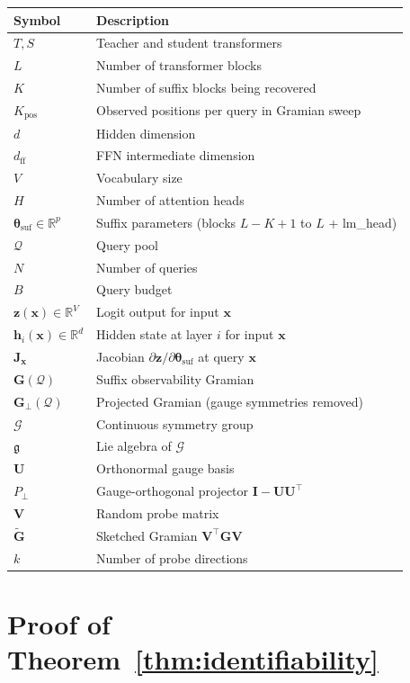 \documentclass{article}
\newcommand{\R}{\mathbb{R}}
\newcommand{\cQ}{\mathcal{Q}}
\newcommand{\cG}{\mathcal{G}}
\newcommand{\btheta}{\boldsymbol{\theta}}
\newcommand{\bz}{\mathbf{z}}
\newcommand{\bh}{\mathbf{h}}
\newcommand{\bx}{\mathbf{x}}
\newcommand{\bJ}{\mathbf{J}}
\newcommand{\bG}{\mathbf{G}}
\newcommand{\bV}{\mathbf{V}}
\newcommand{\bU}{\mathbf{U}}
\newcommand{\bI}{\mathbf{I}}
\begin{document}
\begin{table}[h]
\centering
\small
\begin{tabular}{@{}ll@{}}
\toprule
\textbf{Symbol} & \textbf{Description} \\
\midrule
$T, S$ & Teacher and student transformers \\
$L$ & Number of transformer blocks \\
$K$ & Number of suffix blocks being recovered \\
$K_{\text{pos}}$ & Observed positions per query in Gramian sweep \\
$d$ & Hidden dimension \\
$d_\text{ff}$ & FFN intermediate dimension \\
$V$ & Vocabulary size \\
$H$ & Number of attention heads \\
$\btheta_{\text{suf}} \in \R^p$ & Suffix parameters (blocks $L{-}K{+}1$ to $L$ + lm\_head) \\
$\cQ$ & Query pool \\
$N$ & Number of queries \\
$B$ & Query budget \\
$\bz(\bx) \in \R^V$ & Logit output for input $\bx$ \\
$\bh_i(\bx) \in \R^d$ & Hidden state at layer $i$ for input $\bx$ \\
$\bJ_{\bx}$ & Jacobian $\partial\bz/\partial\btheta_\text{suf}$ at query $\bx$ \\
$\bG(\cQ)$ & Suffix observability Gramian \\
$\bG_\perp(\cQ)$ & Projected Gramian (gauge symmetries removed) \\
$\cG$ & Continuous symmetry group \\
$\mathfrak{g}$ & Lie algebra of $\cG$ \\
$\bU$ & Orthonormal gauge basis \\
$P_\perp$ & Gauge-orthogonal projector $\bI - \bU\bU^\top$ \\
$\bV$ & Random probe matrix \\
$\tilde{\bG}$ & Sketched Gramian $\bV^\top \bG \bV$ \\
$k$ & Number of probe directions \\
\bottomrule
\end{tabular}
\end{table}

\section{Proof of Theorem~\ref{thm:identifiability}}
\label{app:proof}
\end{document}
